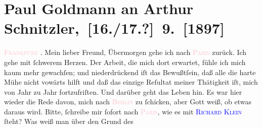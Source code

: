 

               \section[ Paul Goldmann an Arthur Schnitzler, {[}16./17.?{]} 9. {[}1897{]}]{Paul Goldmann an Arthur Schnitzler, {[}16./17.?{]} 9. {[}1897{]}}\nopagebreak{}\rehead{ }\normalsize\beginnumbering{} \toendnotes[C]{\smallbreak\pagebreak[2]} 
\toendnotes[C]{\smallbreak}\pstart
           \raggedleft{}{\pb}\textsc{\textcolor{pink}{Frankfurt}{}\ledrightnote{\textcolor{pink}{Frankfurt am Main}}}{ }\label{K_L02824-48v}\label{K_L02824-48h}.\pend
           \pstart{}Mein lieber Freund,\pend\pstart
           Übermorgen gehe ich nach \textsc{\textcolor{pink}{Paris}{}\ledrightnote{\textcolor{pink}{Paris}}} zurück. Ich gehe mit ſchwerem Herzen. Der Arbeit, die mich dort erwartet, fühle
               ich mich kaum mehr gewachſen; und niederdrückend iſt das Bewußtſein, daß alle die
               harte Mühe nicht vowärts hilft und daß das einzige Reſultat meiner Thätigkeit iſt,
               mich von Jahr zu Jahr fortzufriſten. Und darüber geht das Leben  hin. Es war hier wieder die Rede davon, mich nach
                  \textsc{\textcolor{pink}{Berlin}{}\ledrightnote{\textcolor{pink}{Berlin}}} zu ſchicken, aber Gott weiß, ob etwas daraus wird.\pend
           \pstart
           Bitte, ſchreibe mir ſofort nach \textsc{\textcolor{pink}{Paris}{}\ledrightnote{\textcolor{pink}{Paris}}}, wie es mit \textsc{\textcolor{blue}{Richard Klein}{}\ledrightnote{\textcolor{blue}{Richard Klein}}} ſteht? Was weiß man {\pb}über den Grund des
